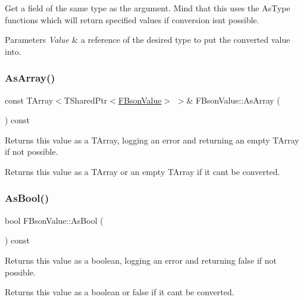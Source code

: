 Get a field of the same type as the argument. Mind that this uses the As\+Type functions which will return specified values if conversion isn\textquotesingle{}t possible.


\begin{DoxyParams}{Parameters}
{\em Value} & a reference of the desired type to put the converted value into. \\
\hline
\end{DoxyParams}
\mbox{\label{class_f_bson_value_a5a4a7cd0de121f66fd5ce0fbc78e86ed}} 
\subsubsection{\texorpdfstring{As\+Array()}{AsArray()}}
{\footnotesize\ttfamily const T\+Array$<$T\+Shared\+Ptr$<$\mbox{\hyperlink{class_f_bson_value}{F\+Bson\+Value}}$>$ $>$\& F\+Bson\+Value\+::\+As\+Array (\begin{DoxyParamCaption}{ }\end{DoxyParamCaption}) const}

Returns this value as a T\+Array, logging an error and returning an empty T\+Array if not possible.

\begin{DoxyReturn}{Returns}
this value as a T\+Array or an empty T\+Array if it can\textquotesingle{}t be converted. 
\end{DoxyReturn}
\mbox{\label{class_f_bson_value_a0ec04eea92e4162d6887054ee8e3ab35}} 
\subsubsection{\texorpdfstring{As\+Bool()}{AsBool()}}
{\footnotesize\ttfamily bool F\+Bson\+Value\+::\+As\+Bool (\begin{DoxyParamCaption}{ }\end{DoxyParamCaption}) const}

Returns this value as a boolean, logging an error and returning false if not possible.

\begin{DoxyReturn}{Returns}
this value as a boolean or false if it can\textquotesingle{}t be converted. 
\end{DoxyReturn}
\mbox{\label{class_f_bson_value_ad23915f0921fb59d158a6ebf5ddfe5f9}} 
